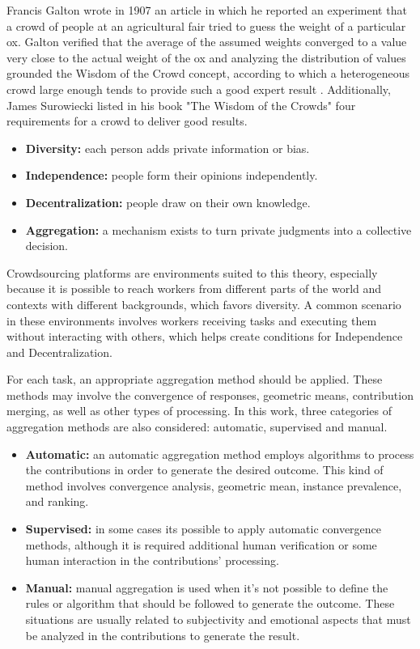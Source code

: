 Francis Galton wrote in 1907 an article in which he reported an experiment that a crowd of people at an agricultural fair tried to guess the weight of a particular ox. Galton verified that the average of the assumed weights converged to a value very close to the actual weight of the ox and analyzing the distribution of values grounded the Wisdom of the Crowd concept, according to which a heterogeneous crowd large enough tends to provide such a good expert result \cite{GALTON1907}. Additionally, James Surowiecki listed in his book "The Wisdom of the Crowds" \cite{surowiecki2005wisdom} four requirements for a crowd to deliver good results.

\begin{itemize}
\item{\textbf{Diversity:}} each person adds private information or bias.
\item{\textbf{Independence:}} people form their opinions independently.
\item{\textbf{Decentralization:}} people draw on their own knowledge.
\item{\textbf{Aggregation:}} a mechanism exists to turn private judgments into a collective decision.
\end{itemize}

Crowdsourcing platforms are environments suited to this theory, especially because it is possible to reach workers from different parts of the world and contexts with different backgrounds, which favors diversity. A common scenario in these environments involves workers receiving tasks and executing them without interacting with others, which helps create conditions for Independence and Decentralization.

For each task, an appropriate aggregation method should be applied. These methods may involve the convergence of responses, geometric means, contribution merging, as well as other types of processing. In this work, three categories of aggregation methods are also considered: automatic, supervised and manual.

\begin{itemize}

\item{\textbf{Automatic:}} an automatic aggregation method employs algorithms to process the contributions in order to generate the desired outcome. This kind of method involves convergence analysis, geometric mean, instance prevalence, and ranking. 

\item{\textbf{Supervised:}} in some cases its possible to apply automatic convergence methods, although it is required additional human verification or some human interaction in the contributions' processing. 

\item{\textbf{Manual:}} manual aggregation is used when it's not possible to define the rules or algorithm that should be followed to generate the outcome. These situations are usually related to subjectivity and emotional aspects that must be analyzed in the contributions to generate the result.

\end{itemize}
